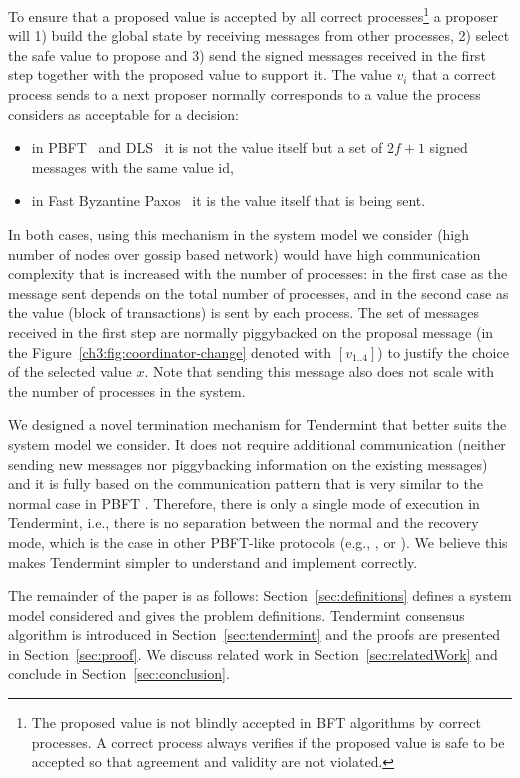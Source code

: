 To ensure that a proposed value is accepted by all correct processes\footnote{The proposed value is not blindly accepted in BFT algorithms by correct processes. A correct process always verifies if the proposed value is safe to be accepted so that agreement and validity are not violated.} a proposer will 1) build the global state by receiving messages from other processes, 2) select the safe value to propose and 3) send the signed messages received in the first step together with the proposed value to support it. The value $v_i$ that a correct process sends to a next proposer normally corresponds to a value the process considers as acceptable for a decision: 

\begin{itemize}
	\item in PBFT~\cite{CL99:osdi} and DLS~\cite{DLS88:jacm} it is not the value itself but a set of $2f+1$ signed messages with the same value id,
	\item in Fast Byzantine Paxos~\cite{MA06:tdsc} it is the value itself that is being sent.  
\end{itemize}

In both cases, using this mechanism in the system model we consider (high number of nodes over gossip based network) would have high communication complexity that is increased with the number of processes: in the first case as the message sent depends on the total number of processes, and in the second case as the value (block of transactions) is sent by each process. The set of messages received in the first step are normally piggybacked on the proposal message (in the Figure~\ref{ch3:fig:coordinator-change} denoted with $[v_{1..4}]$) to justify the choice of the selected value $x$. Note that sending this message also does not scale with the number of processes in the system.   

We designed a novel termination mechanism for Tendermint that better suits the system model we consider. It does not require additional communication (neither sending new messages nor piggybacking information on the existing messages) and it is
fully based on the communication pattern that is very similar to the normal case in PBFT \cite{CL99:osdi}. Therefore, there is only a single mode of execution in Tendermint, i.e., there is no separation between the normal and the recovery mode, which is the case in other PBFT-like protocols (e.g., \cite{CL99:osdi}, \cite{Ver09:spinning} or \cite{Cle09:aardvark}). We believe this makes Tendermint simpler to understand and implement correctly.  

The remainder of the paper is as follows: Section~\ref{sec:definitions} defines a system model considered and gives the problem definitions. Tendermint consensus algorithm 
is introduced in Section~\ref{sec:tendermint} and the proofs are presented in Section~\ref{sec:proof}. We discuss related work in Section~\ref{sec:relatedWork} and conclude in Section~\ref{sec:conclusion}.  

